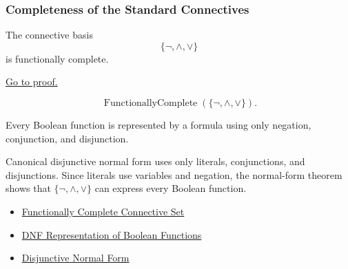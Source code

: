 \subsubsection*{Completeness of the Standard Connectives}

\begin{tcolorbox}[colback=thmbox, colframe=thmborder, arc=2pt,
  left=6pt, right=6pt, top=4pt, bottom=4pt,
  title={\small\textbf{Theorem (Standard Connectives are Functionally Complete)}},
  fonttitle=\small\bfseries]
\begin{theorem}
\label{thm:standard-connectives-functionally-complete-propositional-logic}
The connective basis
\[
\{\neg,\land,\lor\}
\]
is functionally complete.

\noindent\hyperref[prf:standard-connectives-functionally-complete-propositional-logic]{Go to proof.}
\end{theorem}
\end{tcolorbox}

\begin{remark*}
\[
\operatorname{FunctionallyComplete}(\{\neg,\land,\lor\}).
\]
\end{remark*}

\begin{remark*}
Every Boolean function is represented by a formula using only negation,
conjunction, and disjunction.
\end{remark*}

\begin{remark*}[Interpretation]
Canonical disjunctive normal form uses only literals, conjunctions, and
disjunctions. Since literals use variables and negation, the normal-form theorem
shows that \(\{\neg,\land,\lor\}\) can express every Boolean function.
\end{remark*}

\begin{dependencies}
\begin{itemize}
  \item \hyperref[def:functionally-complete-connective-set-propositional-logic]{Functionally Complete Connective Set}
  \item \hyperref[thm:dnf-representation-of-boolean-functions-propositional-logic]{DNF Representation of Boolean Functions}
  \item \hyperref[def:disjunctive-normal-form-propositional-logic]{Disjunctive Normal Form}
\end{itemize}
\end{dependencies}

